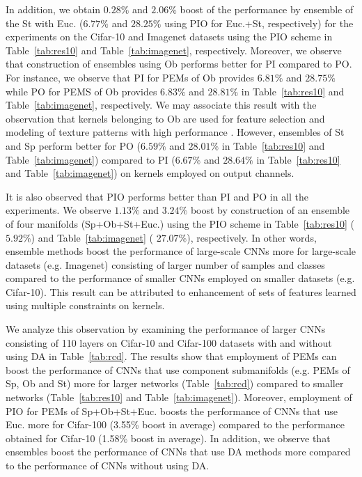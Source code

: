 \documentclass[10pt,journal,compsoc]{IEEEtran}
\theoremstyle{definition}
\theoremstyle{definition}
\theoremstyle{remark}
\theoremstyle{remark}
\theoremstyle{remark}
\begin{document}
In addition, we obtain $0.28\%$ and $2.06\%$ boost of the performance by ensemble of the St with Euc. ($6.77\%$ and $28.25\%$ using PIO for Euc.+St, respectively) for the experiments on the Cifar-10 and Imagenet datasets using the  PIO scheme in Table~\ref{tab:res10} and Table~\ref{tab:imagenet}, respectively. Moreover, we observe that construction of ensembles using Ob performs better for PI compared to PO. For instance, we observe that PI for PEMs of Ob provides $6.81\%$ and $28.75\%$ while PO for PEMS of Ob provides $6.83\%$ and $28.81\%$ in Table~\ref{tab:res10} and Table~\ref{tab:imagenet}, respectively.   We may associate this result with the observation that kernels belonging to Ob are used for feature selection and modeling of texture patterns with high performance \cite{oblq,oo16}. However, ensembles of St and Sp perform better for PO ($6.59\%$ and $28.01\%$ in Table~\ref{tab:res10} and Table~\ref{tab:imagenet}) compared to PI ($6.67\%$ and $28.64\%$ in Table~\ref{tab:res10} and Table~\ref{tab:imagenet}) on kernels employed on output channels. 

It is also observed that  PIO performs better than PI and PO in all the experiments. We observe {\color{blue} $1.13\%$} and {\color{blue} $3.24\%$} boost by construction of an ensemble of four manifolds (Sp+Ob+St+Euc.) using the  PIO scheme in Table~\ref{tab:res10}  ({\color{blue} $5.92\%$}) and Table~\ref{tab:imagenet} ({\color{blue} $27.07\%$}), respectively. In other words, ensemble methods boost the performance of large-scale CNNs more for large-scale datasets (e.g. Imagenet) consisting of larger number of samples and classes compared to the performance of smaller CNNs employed on smaller datasets (e.g. Cifar-10). This result can be attributed to enhancement of sets of features learned using multiple constraints on kernels.

We analyze this observation by examining the performance of larger CNNs consisting of 110 layers on Cifar-10 and Cifar-100 datasets with and without using DA in Table~\ref{tab:rcd}. The results show that employment of PEMs can boost the performance of CNNs that use component submanifolds (e.g. PEMs of Sp, Ob and St) more for larger networks (Table~\ref{tab:rcd}) compared to smaller networks (Table~\ref{tab:res10} and Table~\ref{tab:imagenet}).  Moreover, employment of PIO for PEMs of Sp+Ob+St+Euc. boosts the performance of CNNs that use {\color{red}Euc.} more for Cifar-100 (3.55\% boost in average) compared to the performance obtained for Cifar-10 (1.58\% boost in average). In addition, we observe that ensembles boost the performance of CNNs that use DA methods more compared to the performance of CNNs without using DA. %
\end{document}
